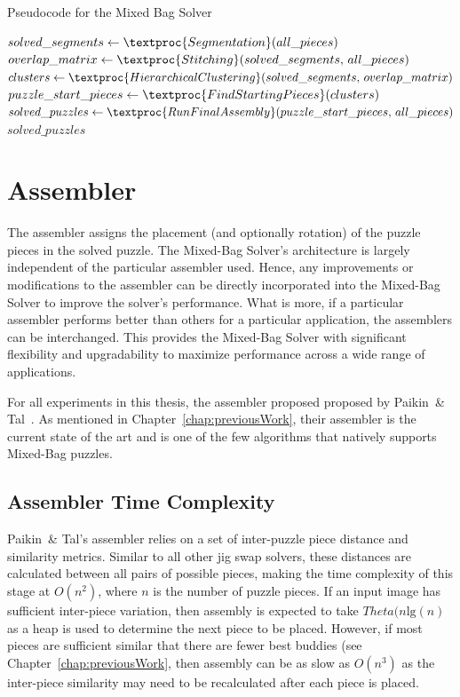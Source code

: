 \begin{algorithm}[tb]
\caption{Pseudocode for the Mixed Bag Solver}\label{alg:mixedBagSolver}
\begin{algorithmic}[1]
    \State $solved\_segments \gets \textproc{Segmentation}\text{(} all\_pieces \text{)}$
	\State $overlap\_matrix \gets \textproc{Stitching}\text{(} solved\_segments \text{, } all\_pieces \text{)}$
	\State $clusters \gets \textproc{HierarchicalClustering} \text{(}solved\_segments \text{, } overlap\_matrix \text{)}$
	\State $puzzle\_start\_pieces \gets \textproc{FindStartingPieces} \text{(} clusters \text{)}$
	\State $solved\_puzzles \gets \textproc{RunFinalAssembly} \text{(} puzzle\_start\_pieces \text{, } all\_pieces \text{)}$
    \State \Return $solved\_puzzles$
\EndFunction
\end{algorithmic}
\end{algorithm}

\section{Assembler}\label{sec:SolverAssembler}

The assembler assigns the placement (and optionally rotation) of the puzzle pieces in the solved puzzle.  The Mixed-Bag Solver's architecture is largely independent of the particular assembler used.  Hence, any improvements or modifications to the assembler can be directly incorporated into the Mixed-Bag Solver to improve the solver's performance.  What is more, if a particular assembler performs better than others for a particular application, the assemblers can be interchanged.  This provides the Mixed-Bag Solver with significant flexibility and upgradability to maximize performance across a wide range of applications.

For all experiments in this thesis, the assembler proposed proposed by Paikin~\& Tal~\cite{paikin2015}.  As mentioned in Chapter~\ref{chap:previousWork}, their assembler is the current state of the art and is one of the few algorithms that natively supports Mixed-Bag puzzles.

\subsection{Assembler Time Complexity}\label{sec:assemblerTimeComplexity}

Paikin~\& Tal's assembler relies on a set of inter-puzzle piece distance and similarity metrics.  Similar to all other jig swap solvers, these distances are calculated between all pairs of possible pieces, making the time complexity of this stage at $O(n^2)$, where $n$ is the number of puzzle pieces.  If an input image has sufficient inter-piece variation, then assembly is expected to take $Theta(n \text{lg}(n)$ as a heap is used to determine the next piece to be placed.  However, if most pieces are sufficient similar that there are fewer best buddies (see Chapter~\ref{chap:previousWork}, then assembly can be as slow as $O(n^3)$ as the inter-piece similarity may need to be recalculated after each piece is placed.

